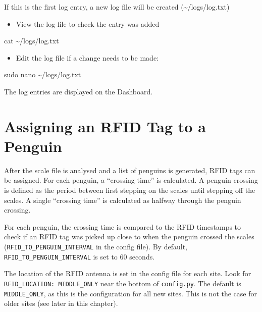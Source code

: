 \documentclass[
  letterpaper,
]{scrbook}
\newenvironment{Shaded}{\begin{snugshade}}{\end{snugshade}}
\newcommand{\FunctionTok}[1]{\textcolor[rgb]{0.28,0.35,0.67}{#1}}
\newcommand{\NormalTok}[1]{\textcolor[rgb]{0.00,0.23,0.31}{#1}}
\providecommand{\tightlist}{%
  \setlength{\itemsep}{0pt}\setlength{\parskip}{0pt}}
\begin{document}
If this is the first log entry, a new log file will be created
(\textasciitilde/logs/log.txt)

\begin{itemize}
\tightlist
\item
  View the log file to check the entry was added
\end{itemize}

\begin{Shaded}
\begin{Highlighting}[]
\FunctionTok{cat}\NormalTok{ \textasciitilde{}/logs/log.txt}
\end{Highlighting}
\end{Shaded}

\begin{itemize}
\tightlist
\item
  Edit the log file if a change needs to be made:
\end{itemize}

\begin{Shaded}
\begin{Highlighting}[]
\FunctionTok{sudo}\NormalTok{ nano \textasciitilde{}/logs/log.txt}
\end{Highlighting}
\end{Shaded}

The log entries are displayed on the Dashboard.

\section{Assigning an RFID Tag to a
Penguin}\label{assigning-an-rfid-tag-to-a-penguin}

After the scale file is analysed and a list of penguins is generated,
RFID tags can be assigned. For each penguin, a ``crossing time'' is
calculated. A penguin crossing is defined as the period between first
stepping on the scales until stepping off the scales. A single
``crossing time'' is calculated as halfway through the penguin crossing.

For each penguin, the crossing time is compared to the RFID timestamps
to check if an RFID tag was picked up close to when the penguin crossed
the scales (\texttt{RFID\_TO\_PENGUIN\_INTERVAL} in the config file). By
default, \texttt{RFID\_TO\_PENGUIN\_INTERVAL} is set to 60 seconds.

The location of the RFID antenna is set in the config file for each
site. Look for
\texttt{\textquotesingle{}RFID\_LOCATION\textquotesingle{}:\ \textquotesingle{}MIDDLE\_ONLY\textquotesingle{}}
near the bottom of \texttt{config.py}. The default is
\texttt{\textquotesingle{}MIDDLE\_ONLY\textquotesingle{}}, as this is
the configuration for all new sites. This is not the case for older
sites (see later in this chapter).
\end{document}
